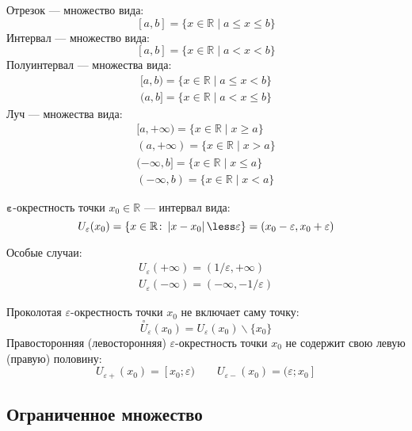 {\bold Отрезок} --- множество вида:
$$[a,b]=\{x\in\mathbb{R}\mid a\leq x\leq b\}$$
{\bold Интервал} --- множество вида:
$$[a,b]=\{x\in\mathbb{R}\mid a\less x\less b\}$$
{\bold Полуинтервал} --- множества вида:
$$\begin{gathered}
[a,b)=\{x\in\mathbb{R}\mid a\leq x\less b\}\\
(a,b]=\{x\in\mathbb{R}\mid a\less x\leq b\}
\end{gathered}$$
{\bold Луч} --- множества вида:
$$\begin{gathered}
[a,+\infty)=\{x\in\mathbb{R}\mid x\geq a\}\\
(a,+\infty)=\{x\in\mathbb{R}\mid x\greater a\}\\
(-\infty,b]=\{x\in\mathbb{R}\mid x\leq a\}\\
(-\infty,b)=\{x\in\mathbb{R}\mid x\less a\}
\end{gathered}$$
\begin{theorem}
{\bold $\symbf{\varepsilon}$-окрестность} точки $x_0\in\mathbb{R}$ --- интервал вида:
$$U_\varepsilon(x_0)=\{x\in\mathbb{R}\colon\abs{x-x_0}\less\varepsilon\}=(x_0-\varepsilon,x_0+\varepsilon)$$

Особые случаи:
$$\begin{gathered}
U_\varepsilon(+\infty)=(1/\varepsilon,+\infty)\\
U_\varepsilon(-\infty)=(-\infty,-1/\varepsilon)
\end{gathered}$$
\end{theorem}
{\bold Проколотая} $\varepsilon$-окрестность точки $x_0$ не включает саму точку:\\[-8pt]
$$\overset{\circ}{U}_\varepsilon(x_0)=U_\varepsilon(x_0)\backslash\{x_0\}$$
{\bold Правосторонняя (левосторонняя)} $\varepsilon$-окрестность точки $x_0$
не содержит свою {\ital левую  (правую)} половину:
$$U_{\varepsilon+}(x_0)=[x_0;\varepsilon)\quad\quad U_{\varepsilon-}(x_0)=(\varepsilon;x_0]$$

\subsection{Ограниченное множество}

